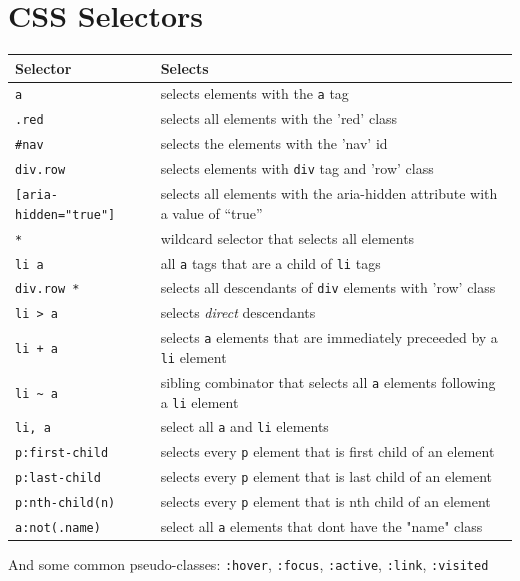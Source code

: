 \documentclass[11pt]{article}
\begin{document}
\section{CSS Selectors}
\label{sec:org849f2cc}
\begin{center}
\begin{tabular}{ll}
Selector & Selects\\
\hline
\texttt{a} & selects elements with the \texttt{a} tag\\
\texttt{.red} & selects all elements with the 'red' class\\
\texttt{\#nav} & selects the elements with the 'nav' id\\
\texttt{div.row} & selects elements with \texttt{div} tag and 'row' class\\
\texttt{[aria-hidden="true"]} & selects all elements with the aria-hidden attribute with a value of “true”\\
\texttt{*} & wildcard selector that selects all elements\\
\texttt{li a} & all \texttt{a} tags that are a child of \texttt{li} tags\\
\texttt{div.row *} & selects all descendants of \texttt{div} elements with 'row' class\\
\texttt{li > a} & selects \emph{direct} descendants\\
\texttt{li + a} & selects \texttt{a} elements that are immediately preceeded by a \texttt{li} element\\
\texttt{li \textasciitilde{} a} & sibling combinator that selects all \texttt{a} elements following a \texttt{li} element\\
\texttt{li, a} & select all \texttt{a} and \texttt{li} elements\\
\texttt{p:first-child} & selects every \texttt{p} element that is first child of an element\\
\texttt{p:last-child} & selects every \texttt{p} element that is last child of an element\\
\texttt{p:nth-child(n)} & selects every \texttt{p} element that is nth child of an element\\
\texttt{a:not(.name)} & select all \texttt{a} elements that dont have the "name" class\\
\end{tabular}
\end{center}

And some common pseudo-classes: \texttt{:hover}, \texttt{:focus}, \texttt{:active}, \texttt{:link}, \texttt{:visited}
\end{document}
